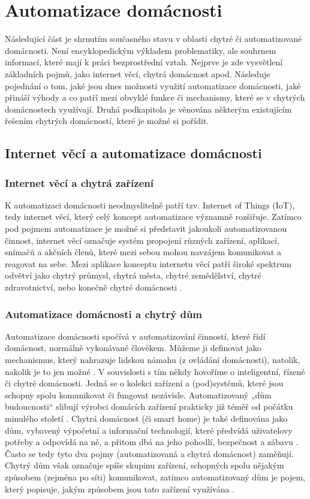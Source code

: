 \chapter{Automatizace domácnosti}
Následující část je shrnutím současného stavu v oblasti chytré či automatizované domácnosti. Není encyklopedickým výkladem problematiky, ale souhrnem informací, které mají k práci bezprostřední vztah. Nejprve je zde vysvětlení základních pojmů, jako internet věcí, chytrá domácnost apod. Následuje pojednání o tom, jaké jsou dnes možnosti využití automatizace domácnosti, jaké přináší výhody a co patří mezi obvyklé funkce či mechanismy, které se v chytrých domácnostech využívají. Druhá podkapitola je věnována některým existujícím řešením chytrých domácností, které je možné si pořídit.

\section{Internet věcí a automatizace domácnosti}
\subsection*{Internet věcí a chytrá zařízení}
K automatizaci domácnosti neodmyslitelně patří tzv. Internet of Things (IoT), tedy internet věcí, který celý koncept automatizace významně rozšiřuje. Zatímco pod pojmem automatizace je možné si představit jakoukoli automatizovanou činnost, internet věcí označuje systém propojení různých zařízení, aplikací, snímačů a akčních členů, které mezi sebou mohou navzájem komunikovat a reagovat na sebe. Mezi aplikace konceptu internetu věcí patří široké spektrum odvětví jako chytrý průmysl, chytrá města, chytré zemědělství, chytré zdravotnictví, nebo konečně chytré domácnosti \cite{IoT}.

\subsection*{Automatizace domácnosti a chytrý dům}
Automatizace domácnosti spočívá v automatizování činností, které řídí domácnost, normálně vykonávané člověkem. Můžeme ji definovat jako mechanismus, který nahrazuje lidskou námahu (z ovládání domácnosti), natolik, nakolik je to jen možné \cite{HomeAutomationRPI}. V souvislosti s tím někdy hovoříme o inteligentní, řízené či chytré domácnosti. Jedná se o kolekci zařízení a (pod)systémů, které jsou schopny spolu komunikovat či fungovat nezávisle. Automatizovaný „dům budoucnosti“ slibují výrobci domácích zařízení prakticky již téměř od počátku minulého století \cite{HomeAutomationAndWiring}. Chytrá domácnost (či smart home) je také definována jako dům, vybavený výpočetní a informační technologií, které předvídá uživatelovy potřeby a odpovídá na ně, a přitom dbá na jeho pohodlí, bezpečnost a zábavu \cite{InsideTheSmartHome}. Často se tedy tyto dva pojmy (automatizovaná a chytrá domácnost) zaměňují. Chytrý dům však označuje spíše skupinu zařízení, schopných spolu nějakým způsobem (zejména po síti) komunikovat, zatímco automatizovaný dům je pojem, který popisuje, jakým způsobem jsou tato zařízení využívána \cite{SmartHomeVsHomeAutomation}.

